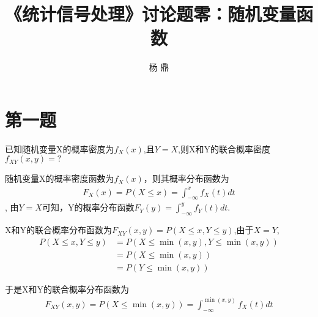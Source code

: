 \documentclass[fontset=windows]{article}
\title{\heiti\zihao{2} 《统计信号处理》讨论题零：随机变量函数}
\author{杨 鼎}
\date{}
\numberwithin{figure}{section}
\begin{document}
\maketitle
\thispagestyle{empty}



\section{第一题}
已知随机变量X的概率密度为\(f_X(x)\),且\(Y=X\),则X和Y的联合概率密度\(f_{XY}(x,y)=?\)

随机变量X的概率密度函数为\(f_X(x)\)，则其概率分布函数为
\begin{align*}
    F_X(x)=P(X\leq x)=\int_{-\infty}^{x} f_X(t)dt
\end{align*},
由\(Y=X\)可知，Y的概率分布函数\(F_Y(y)=\int_{-\infty}^{y}f_Y(t)dt\).

X和Y的联合概率分布函数为\(F_{XY}(x,y)=P(X\leq x,Y\leq y)\),由于\(X=Y\),
\begin{align*}
    P(X\leq x,Y\leq y)
     & =P(X\leq \min(x,y),Y\leq \min(x,y)) \\
     & =P(X\leq \min(x,y))                 \\
     & =P(Y\leq \min(x,y))
\end{align*}



于是X和Y的联合概率分布函数为
\begin{align*}
    F_{XY}(x,y)=P(X\leq \min(x,y))=\int_{-\infty}^{\min(x,y)} f_{X}(t)dt
\end{align*}
\end{document}

